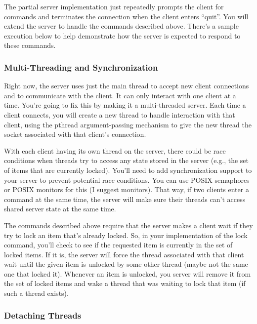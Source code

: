 \documentclass{article}
\begin{document}
\begin{enumerate}
  The partial server implementation just repeatedly prompts the client
  for commands and terminates the connection when the client enters
  ``quit''.  You will extend the server to handle the commands
  described above.  There's a sample execution below to help demonstrate
  how the server is expected to respond to these commands.

\subsubsection*{Multi-Threading and Synchronization}

  Right now, the server uses just the main thread to accept new client
  connections and to communicate with the client.  It can only
  interact with one client at a time.  You're going to fix this by
  making it a multi-threaded server.  Each time a client connects, you
  will create a new thread to handle interaction with that client,
  using the pthread argument-passing mechanism to give the new thread
  the socket associated with that client's connection.

  With each client having its own thread on the server, there could be
  race conditions when threads try to access any state stored in the
  server (e.g., the set of items that are currently locked).  You'll
  need to add synchronization support to your server to prevent
  potential race conditions.  You can use POSIX semaphores or POSIX
  monitors for this (I suggest monitors).  That way, if two clients
  enter a command at the same time, the server will make sure their
  threads can't access shared server state at the same time.

  The commands described above require that the server makes a client
  wait if they try to lock an item that's already locked.  So,
  in your implementation of the lock command, you'll check to see if
  the requested item is currently in the set of locked items.  If it
  is, the server will force the thread associated with that client wait
  until the given item is unlocked by some other thread (maybe not the
  same one that locked it).  Whenever an item is unlocked, you server
  will remove it from the set of locked items and wake a thread that
  was waiting to lock that item (if such a thread exists).

\subsubsection*{Detaching Threads}


\end{enumerate}
\end{document}
